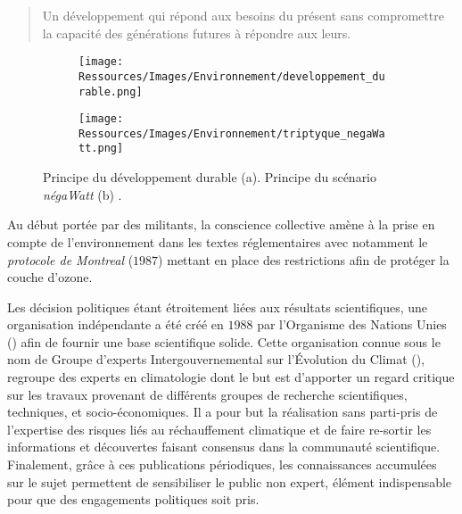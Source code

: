 \blockquote{
    Un développement qui répond aux besoins du présent sans
    compromettre la capacité des générations futures à répondre aux leurs.
}

\begin{figure}
    \centering
    \begin{subfigure}{0.55\textwidth}
        \centering
        \texttt{[image: Ressources/Images/Environnement/developpement\_durable.png]}
        \caption{}
        \label{fig:developpement_durable}
    \end{subfigure}
    \quad
    \begin{subfigure}{0.4\textwidth}
        \centering
        \texttt{[image: Ressources/Images/Environnement/triptyque\_negaWatt.png]}
        \caption{}
        \label{fig:negawatt_axes}
    \end{subfigure}
    \caption[Principe du développement durable et du scénario négaWatt]
             {Principe du développement durable \protect\footnotemark (a). Principe du
              scénario \textit{négaWatt} (b) \parencite{Salomon2012}.}
    \label{fig:developpement_durable_negawatt}
\end{figure}


Au début portée par des militants, la conscience collective amène à la prise en compte de
l’environnement dans les textes réglementaires avec notamment le \textit{protocole de
Montreal} ($1987$) mettant en place des restrictions afin de protéger la couche d’ozone.

Les décision politiques étant étroitement liées aux résultats scientifiques,
une organisation indépendante a été créé en $1988$ par l’Organisme des Nations
Unies () afin de fournir une base scientifique solide. Cette organisation connue sous le nom de
Groupe d'experts Intergouvernemental sur l'Évolution du Climat (), regroupe
des experts en climatologie dont le but est d’apporter un regard critique sur
les travaux provenant de différents groupes de recherche scientifiques, techniques,
et socio-économiques. Il a pour but la réalisation sans parti-pris de l’expertise
des risques liés au réchauffement climatique et de faire re-sortir les informations
et découvertes faisant consensus dans la communauté scientifique. Finalement, grâce à ces
publications périodiques, les connaissances accumulées sur le sujet permettent de
sensibiliser le public non expert, élément indispensable pour que des engagements
politiques soit pris.

